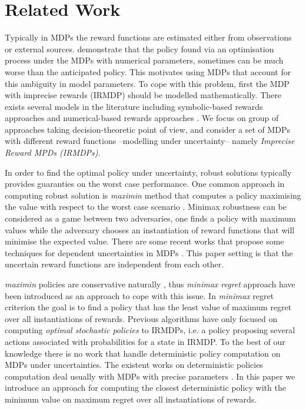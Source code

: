 \section{Related Work}

Typically in MDPs the reward functions are estimated either from observations or external sources.  demonstrate that the policy found via an optimisation process under the MDPs with numerical parameters, sometimes can be much worse than the anticipated policy. This motivates using MDPs that account for this ambiguity in model parameters. To cope with this problem, first the MDP with imprecise rewards (IRMDP) should be modelled mathematically. There exists several models in the literature including symbolic-based rewards approaches \cite{Furnkranz2012,Weng2012} and numerical-based rewards approaches \cite{bell1982,Regan2009,Xu2009}. We focus on group of approaches taking decision-theoretic point of view, and consider a set of MDPs with different reward functions --modelling under uncertainty-- namely \textit{Imprecise Reward MPDs (IRMDPs)}. 


In order to find the optimal policy under uncertainty, robust solutions typically provides guaranties on the worst case performance. One common approach in computing robust solution is \textit{maximin} method that computes a policy maximising the value with respect to the worst case scenario \cite{Nilim2005,Iyengar2005,GIVAN2000,mastin2012}. Minimax robustness can be considered as a game between two adversaries, one finds a policy with maximum values while the adversary chooses an instantiation of reward functions that will minimise the expected value. There are some recent works that propose some techniques for dependent uncertainties in MDPs \cite{Wiesemann2013,Mannor2012}. This paper setting is that the uncertain reward functions are independent from each other. 

\textit{maximin} policies are conservative naturally \cite{Delage2007}, thus \textit{minimax regret} approach \cite{Regan2009,Xu2009} have been introduced as an approach to cope with this issue. In \textit{minimax} regret criterion the goal is to find a policy that has the least value of maximum regret over all instantiations of rewards. Previous algorithms \cite{Regan2010,Xu2009,Regan2009} have only focused on computing  \textit{optimal stochastic policies} to IRMDPs, i.e. a policy proposing several actions associated with probabilities for a state in IRMDP. To the best of our knowledge there is no work that handle deterministic policy computation on MDPs under uncertainties. The existent works on deterministic policies computation deal usually with MDPs with precise parameters \cite{Dolgov2005,Montufar2015}. In this paper we introduce an approach for computing the closest deterministic policy with the minimum value on maximum regret over all instantiations of rewards. 